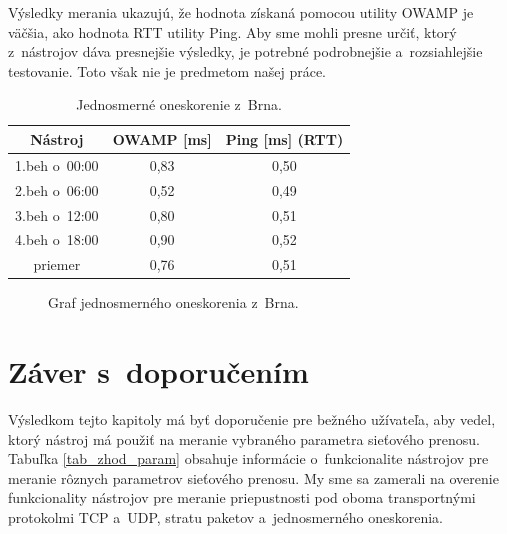         Výsledky merania ukazujú, že hodnota
        získaná pomocou utility OWAMP je väčšia, ako hodnota RTT utility Ping.
        Aby sme mohli presne určiť, ktorý z~nástrojov dáva presnejšie výsledky,
        je potrebné podrobnejšie a~rozsiahlejšie testovanie. Toto však nie je 
        predmetom našej práce.

    \begin{table}[h!]
        \begin{center}
            \begin{tabular}{|c|c|c|}
                \hline
                Nástroj & OWAMP [ms]& Ping [ms] (RTT)\\ 
                \hline
                1.beh o~00:00 & 0,83 & 0,50 \\
                \hline
                2.beh o~06:00 & 0,52 & 0,49 \\
                \hline
                3.beh o~12:00 & 0,80 & 0,51 \\
                \hline
                4.beh o~18:00 & 0,90 & 0,52 \\
                \hline
                priemer & 0,76 & 0,51 \\
                \hline
            \end{tabular}
            \caption{Jednosmerné oneskorenie z~Brna.} 
            \label{tab_test_delay}
        \end{center}
    \end{table}
   \begin{figure}[H]
       \begin{center}
               \caption{Graf jednosmerného oneskorenia z~Brna.}
           \label{tab_test_delay_graf}
       \end{center}
   \end{figure}

   \section{Záver s~doporučením} \label{test_zaver}
    Výsledkom tejto kapitoly má byť doporučenie pre bežného užívateľa, aby
    vedel, ktorý nástroj má použiť na meranie vybraného parametra sieťového
    prenosu. Tabuľka \ref{tab_zhod_param} obsahuje informácie o~funkcionalite nástrojov
    pre meranie rôznych parametrov sieťového prenosu.
    My sme sa zamerali na overenie funkcionality nástrojov pre meranie 
    priepustnosti pod oboma transportnými protokolmi TCP a~UDP, stratu
    paketov a~jednosmerného oneskorenia.

